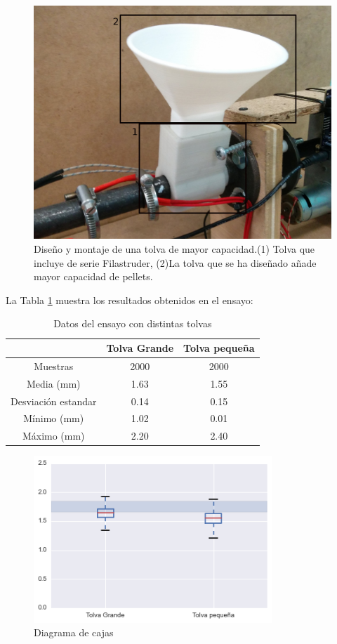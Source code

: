 \begin{figure}[H]
    \centering
        \includegraphics[width=0.5\linewidth]{images/producciones/20072015/IMG_20150721_121904.jpg}
        \caption[Diseño y montaje de una tolva de mayor capacidad.]{Diseño y montaje de una tolva de mayor capacidad.(1) Tolva que incluye de serie Filastruder, (2)La tolva que se ha diseñado añade mayor capacidad de pellets.}
        \label{fig:tolv_montaj}
\end{figure}

La Tabla \ref{tab:ensa_tolvas} muestra los resultados obtenidos en el ensayo:

\begin{table}[H]
    \centering
    \begin{tabular}{ccc}
                            & Tolva Grande & Tolva pequeña \\ \hline
        Muestras               & 2000  & 2000   \\
        Media (mm)          & 1.63     & 1.55      \\
        Desviación estandar & 0.14     & 0.15      \\
        Mínimo (mm)             & 1.02     & 0.01      \\
        Máximo (mm)             & 2.20     & 2.40     
    \end{tabular}
    \caption{Datos del ensayo con distintas tolvas}
    \label{tab:ensa_tolvas}
\end{table}

\begin{figure}[H]
    \centering
    \includegraphics[width=0.8\textwidth]{images/producciones/22072015/output_6_1.png}
    \caption{Diagrama de cajas }
    \label{fig:22072015-boxplot}
\end{figure}

